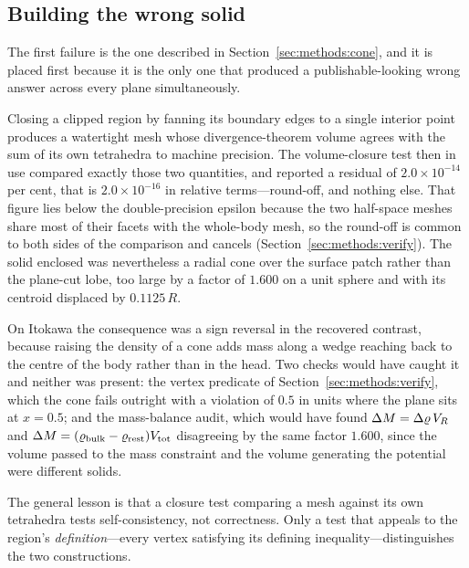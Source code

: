\subsection{Building the wrong solid}
\label{sec:failures:cone}

The first failure is the one described in Section~\ref{sec:methods:cone},
and it is placed first because it is the only one that produced a
publishable-looking wrong answer across every plane simultaneously.

Closing a clipped region by fanning its boundary edges to a single interior
point produces a watertight mesh whose divergence-theorem volume agrees
with the sum of its own tetrahedra to machine precision. The
volume-closure test then in use compared exactly those two quantities, and
reported a residual of $2.0\times10^{-14}$ per cent, that is
$2.0\times10^{-16}$ in relative terms---round-off, and nothing else. That
figure lies below the double-precision epsilon because the two half-space
meshes share most of their facets with the whole-body mesh, so the round-off
is common to both sides of the comparison and cancels
(Section~\ref{sec:methods:verify}). The solid enclosed was nevertheless a radial cone over
the surface patch rather than the plane-cut lobe, too large by a factor of
$1.600$ on a unit sphere and with its centroid displaced by $0.1125\,R$.

On Itokawa the consequence was a sign reversal in the recovered contrast,
because raising the density of a cone adds mass along a wedge reaching
back to the centre of the body rather than in the head. Two checks would
have caught it and neither was present: the vertex predicate of
Section~\ref{sec:methods:verify}, which the cone fails outright with a
violation of $0.5$ in units where the plane sits at $x = 0.5$; and the
mass-balance audit, which would have found
$\Delta M = \Delta\varrho\,V_{R}$ and $\Delta M = (\varrho_{\mathrm{bulk}}-\varrho_{\mathrm{rest}})V_{\mathrm{tot}}$
disagreeing by the same factor $1.600$, since the volume passed to the
mass constraint and the volume generating the potential were different
solids.

The general lesson is that a closure test comparing a mesh against its own
tetrahedra tests self-consistency, not correctness. Only a test that
appeals to the region's \emph{definition}---every vertex satisfying its
defining inequality---distinguishes the two constructions.

